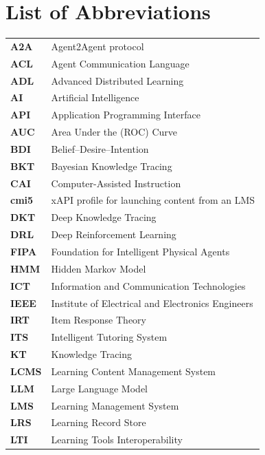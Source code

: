 \chapter*{List of Abbreviations}
\begin{longtable}{@{}L{2.6cm}L{12cm}@{}}
\textbf{A2A}    & Agent2Agent protocol \\
\textbf{ACL}    & Agent Communication Language \\
\textbf{ADL}    & Advanced Distributed Learning \\
\textbf{AI}     & Artificial Intelligence \\
\textbf{API}    & Application Programming Interface \\
\textbf{AUC}    & Area Under the (ROC) Curve \\
\textbf{BDI}    & Belief--Desire--Intention \\
\textbf{BKT}    & Bayesian Knowledge Tracing \\
\textbf{CAI}    & Computer-Assisted Instruction \\
\textbf{cmi5}   & xAPI profile for launching content from an LMS \\
\textbf{DKT}    & Deep Knowledge Tracing \\
\textbf{DRL}    & Deep Reinforcement Learning \\
\textbf{FIPA}   & Foundation for Intelligent Physical Agents \\
\textbf{HMM}    & Hidden Markov Model \\
\textbf{ICT}    & Information and Communication Technologies \\
\textbf{IEEE}   & Institute of Electrical and Electronics Engineers \\
\textbf{IRT}    & Item Response Theory \\
\textbf{ITS}    & Intelligent Tutoring System \\
\textbf{KT}     & Knowledge Tracing \\
\textbf{LCMS}   & Learning Content Management System \\
\textbf{LLM}    & Large Language Model \\
\textbf{LMS}    & Learning Management System \\
\textbf{LRS}    & Learning Record Store \\
\textbf{LTI}    & Learning Tools Interoperability \\

\end{longtable}
